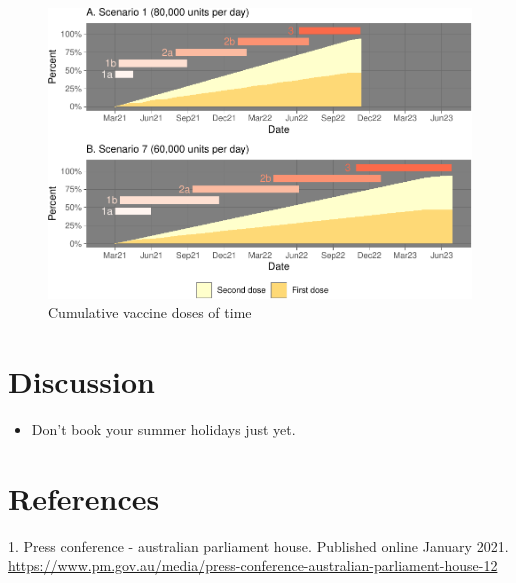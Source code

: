 \documentclass{article}
\begin{document}
\begin{figure}
\centering
\includegraphics{researchNote_files/figure-latex/unnamed-chunk-5-1.pdf}
\caption{Cumulative vaccine doses of time}
\end{figure}

\hypertarget{discussion}{%
\section{Discussion}\label{discussion}}

\begin{itemize}
\tightlist
\item
  Don't book your summer holidays just yet.
\end{itemize}

\hypertarget{references}{%
\section*{References}\label{references}}

\hypertarget{refs}{}
\leavevmode\hypertarget{ref-pm2021}{}%
1. Press conference - australian parliament house. Published online
January 2021.
\url{https://www.pm.gov.au/media/press-conference-australian-parliament-house-12}



\end{document}
